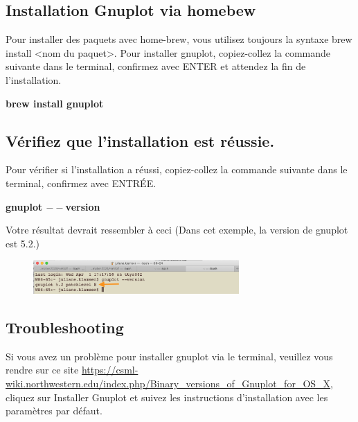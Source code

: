 \documentclass{article}
\begin{document}
\subsection{Installation Gnuplot via homebew}
Pour installer des paquets avec home-brew, vous utilisez toujours la syntaxe brew install <nom du paquet>. Pour installer gnuplot, copiez-collez la commande suivante dans le terminal, confirmez avec ENTER et attendez la fin de l'installation.
\begin{tcolorbox}[width=\textwidth,colframe=Bittersweet,colback={black},title={Ceci est le terminal},outer arc=0mm,colupper=white]    
      \large\textbf{brew install gnuplot}
\end{tcolorbox}
\subsection{Vérifiez que l'installation est réussie.}
Pour vérifier si l'installation a réussi, copiez-collez la commande suivante dans le terminal, confirmez avec ENTRÉE.
\begin{tcolorbox}[width=\textwidth,colframe=Bittersweet,colback={black},title={Ceci est le terminal},outer arc=0mm,colupper=white]    
      \large\textbf{gnuplot $--$version}
\end{tcolorbox}
Votre résultat devrait ressembler à ceci (Dans cet exemple, la version de gnuplot est 5.2.)
\begin{figure}[H]
\center
\includegraphics[width=0.7\textwidth]{Plots/GnuplotCheck.png}
\end{figure}
\subsection{Troubleshooting}
Si vous avez un problème pour installer gnuplot via le terminal, veuillez vous rendre sur ce site \href{https://csml-wiki.northwestern.edu/index.php/Binary_versions_of_Gnuplot_for_OS_X}{https://csml-wiki.northwestern.edu/index.php/Binary\_versions\_of\_Gnuplot\_for\_OS\_X}, cliquez sur Installer Gnuplot et suivez les instructions d'installation avec les paramètres par défaut.
\end{document}
